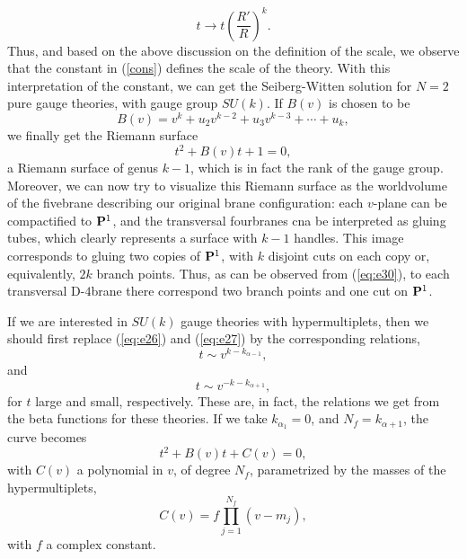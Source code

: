 \begin{equation}
t \rightarrow t \left( \frac {R'}{R} \right) ^k.
\end{equation}
Thus, and based on the above discussion on the definition of the
scale, we observe that the constant in (\ref{cons}) defines the
scale of the theory. With this interpretation of the constant, we
can get the Seiberg-Witten solution for $N=2$ pure gauge
theories, with gauge group $SU(k)$. If $B(v)$ is chosen to be
\begin{equation}
B(v) =v^k +u_2 v^{k-2} + u_3 v^{k-3} + \cdots + u_k,
\label{eq:e29}
\end{equation}
we finally
get the Riemann surface
\begin{equation}
t^2 + B(v) t +1=0,
\label{eq:e30}
\end{equation}
a Riemann surface of genus $k-1$, which
is in fact the rank of the gauge group. 
Moreover, we can now try to visualize this Riemann surface as the
worldvolume of the fivebrane describing our original brane
configuration: each $v$-plane can be compactified to ${\bf P}^1$,
and the transversal fourbranes cna be interpreted as gluing
tubes, which clearly represents a surface with $k-1$ handles.
This image corresponds to gluing two copies of ${\bf P}^1$, with
$k$ disjoint cuts on each copy or, equivalently, $2k$ branch
points. Thus, as can be observed from (\ref{eq:e30}), to each
transversal D-$4$brane there correspond two branch points and one
cut on ${\bf P}^1$.
  
If we are interested in $SU(k)$ gauge theories with
hypermultiplets, then we should first replace (\ref{eq:e26}) and
(\ref{eq:e27}) by the corresponding relations,
\begin{equation}
t \sim v^{k-k_{\alpha-1}},
\label{eq:e31}
\end{equation}
and
\begin{equation}
t \sim v^{-k-k_{\alpha+1}},
\label{eq:e32}
\end{equation}
for $t$ large and small, respectively. These are, in fact, the
relations we get from the beta functions for these theories. If
we take $k_{\alpha_1}=0$, and $N_f=k_{\alpha+1}$, the curve
becomes
\begin{equation}
t^2 + B(v) t + C(v)=0,
\label{eq:e33}
\end{equation}
with $C(v)$ a polynomial in $v$, of degree $N_f$, parametrized by
the masses of the hypermultiplets,
\begin{equation}
C(v) = f \prod _{j=1}^{N_f} (v-m_j),
\label{eq:e34}
\end{equation}
with $f$ a complex constant.
  
